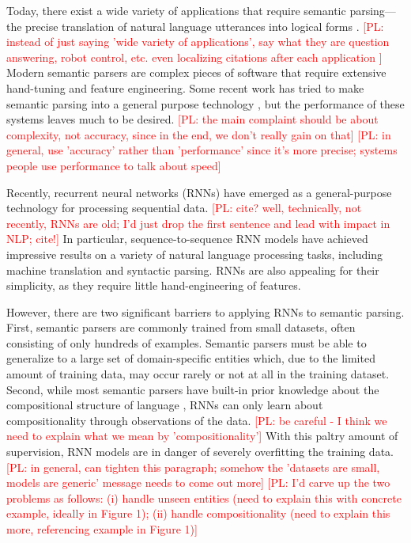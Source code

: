 \documentclass[11pt,letterpaper]{article}
\newcommand\pl[1]{\textcolor{red}{[PL: #1]}}
\begin{document}
Today, there exist a wide variety of applications that 
require semantic parsing---the precise translation of
natural language utterances into logical forms 
\cite{zelle96geoquery,zettlemoyer05ccg,zettlemoyer07relaxed,liang11dcs,artzi2013weakly,berant2013freebase,kushman2013regex}.
\pl{instead of just saying 'wide variety of applications', say what they are
question answering, robot control, etc. even localizing citations after each application
}
Modern semantic parsers are complex pieces of software
that require extensive hand-tuning and feature engineering.
Some recent work has tried to make semantic parsing
into a general purpose technology \cite{wang2015overnight},
but the performance of these systems leaves much to be desired.
\pl{the main complaint should be about complexity, not accuracy,
since in the end, we don't really gain on that}
\pl{in general, use 'accuracy' rather than 'performance' since it's more precise;
systems people use performance to talk about speed}

Recently, recurrent neural networks (RNNs) have emerged
as a general-purpose technology for processing sequential data.
\pl{cite?  well, technically, not recently, RNNs are old; I'd just drop the first sentence
and lead with impact in NLP; cite!}
In particular, sequence-to-sequence RNN models
have achieved impressive results on a variety of natural language processing
tasks, including machine translation and syntactic parsing.
RNNs are also appealing for their simplicity, as they require 
little hand-engineering of features.

However, there are two significant barriers to applying RNNs to semantic parsing.
First, semantic parsers are commonly trained from small datasets,
often consisting of only hundreds of examples.
Semantic parsers
must be able to generalize to a large set of 
domain-specific entities which, due to the limited
amount of training data, may occur rarely or not at all
in the training dataset.
Second, while most semantic parsers have built-in
prior knowledge about the compositional structure of language \cite{zettlemoyer05ccg},
RNNs can only learn about compositionality
through observations of the data.
\pl{be careful - I think we need to explain what we mean by 'compositionality'}
With this paltry amount of supervision,
RNN models are in danger of severely overfitting the training data.
\pl{in general, can tighten this paragraph;
somehow the 'datasets are small, models are generic' message needs to come out more}
\pl{I'd carve up the two problems as follows:
  (i) handle unseen entities (need to explain this with concrete example, ideally in Figure 1);
(ii) handle compositionality (need to explain this more, referencing example in Figure 1)}
\end{document}
